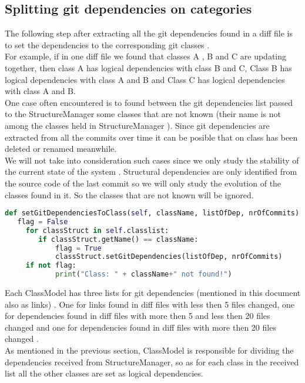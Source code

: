 \subsection{Splitting git dependencies on categories}
\tab The following step after extracting all the git dependencies found in a diff file is to set the dependencies to the corresponding git classes .\\ For example, if in one diff file we found that classes A , B and C are updating together, then class A has logical dependencies with class B and C, Class B has logical dependencies with class A and B and Class C has logical dependencies with class A and B. \\ 
\tab One case often encountered is to found between the git dependencies list passed to the StructureManager some classes that are not known (their name is not among the classes held in StructureManager ). Since git dependencies are extracted from all the commits over time it can be posible that on class has been deleted or renamed meanwhile.\\ We will not take into consideration such cases since we only study the stability of the current state of the system . Structural dependencies are only identified from the source code of the last commit so we will only study the evolution of the classes found in it. So the classes that are not known will be ignored.

\begin{lstlisting}[language=python, caption={Set git dependencies to the coresponding classes.}]
def setGitDependenciesToClass(self, className, listOfDep, nrOfCommits):
   flag = False
     for classStruct in self.classlist:
        if classStruct.getName() == className:
            flag = True
            classStruct.setGitDependencies(listOfDep, nrOfCommits)
     if not flag:
            print("Class: " + className+" not found!")
\end{lstlisting}


\tab Each ClassModel has three lists for git dependencies (mentioned in this document also as links) . One for links found in diff files with less then 5 files changed, one for dependencies found in diff files with more then 5 and less then 20 files changed and one for dependencies found in diff files with more then 20 files changed .\\
\tab As mentioned in the previous section, ClassModel is responsible for dividing the dependencies received from  StructureManager, so as for each class in the received list all the other classes are set as logical dependencies.

